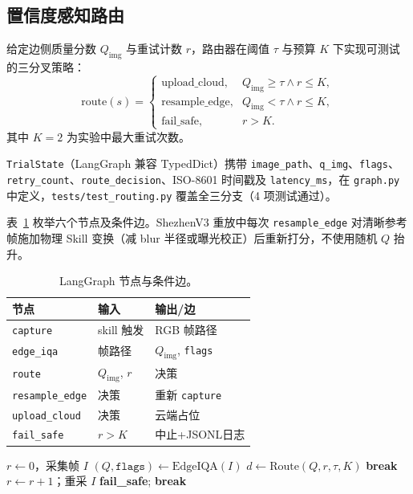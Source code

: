 \subsection{置信度感知路由}
\label{sec:routing-zh}

给定边侧质量分数 $Q_{\mathrm{img}}$ 与重试计数 $r$，路由器在阈值 $\tau$ 与预算 $K$ 下实现可测试的三分叉策略：
\begin{equation}
\text{route}(s)=
\begin{cases}
\text{upload\_cloud}, & Q_{\mathrm{img}}\geq\tau \land r\leq K,\\
\text{resample\_edge}, & Q_{\mathrm{img}}<\tau \land r\leq K,\\
\text{fail\_safe}, & r>K.
\end{cases}
\label{eq:routing-zh}
\end{equation}
其中 $K=2$ 为实验中最大重试次数。

\texttt{TrialState}（LangGraph 兼容 TypedDict）携带 \texttt{image\_path}、\texttt{q\_img}、\texttt{flags}、\texttt{retry\_count}、\texttt{route\_decision}、ISO-8601 时间戳及 \texttt{latency\_ms}，在 \texttt{graph.py} 中定义，\texttt{tests/test\_routing.py} 覆盖全三分支（4 项测试通过）。

表~\ref{tab:langgraph-nodes-zh} 枚举六个节点及条件边。ShezhenV3 重放中每次 \texttt{resample\_edge} 对清晰参考帧施加物理 Skill 变换（减 blur 半径或曝光校正）后重新打分，不使用随机 $Q$ 抬升。

\begin{table}[t]
\centering
\caption{LangGraph 节点与条件边。}
\label{tab:langgraph-nodes-zh}
\small
\begin{tabular}{lll}
\hline
节点 & 输入 & 输出/边 \\
\hline
\texttt{capture} & skill 触发 & RGB 帧路径 \\
\texttt{edge\_iqa} & 帧路径 & $Q_{\mathrm{img}}$, \texttt{flags} \\
\texttt{route} & $Q_{\mathrm{img}}$, $r$ & 决策 \\
\texttt{resample\_edge} & 决策 & 重新 \texttt{capture} \\
\texttt{upload\_cloud} & 决策 & 云端占位 \\
\texttt{fail\_safe} & $r>K$ & 中止+JSONL日志 \\
\hline
\end{tabular}
\end{table}

\begin{algorithm}[t]
\caption{置信度感知路由循环（B2）}
\begin{algorithmic}[1]
\STATE $r \leftarrow 0$，采集帧 $I$
\REPEAT
  \STATE $(Q,\texttt{flags}) \leftarrow \text{EdgeIQA}(I)$
  \STATE $d \leftarrow \text{Route}(Q,r,\tau,K)$ 
    \STATE \textbf{break}
    \STATE $r \leftarrow r+1$；重采 $I$
  \ELSE
    \STATE \textbf{fail\_safe}; \textbf{break}
  \ENDIF
{}
\end{algorithmic}
\label{alg:routing-loop-zh}
\end{algorithm}

